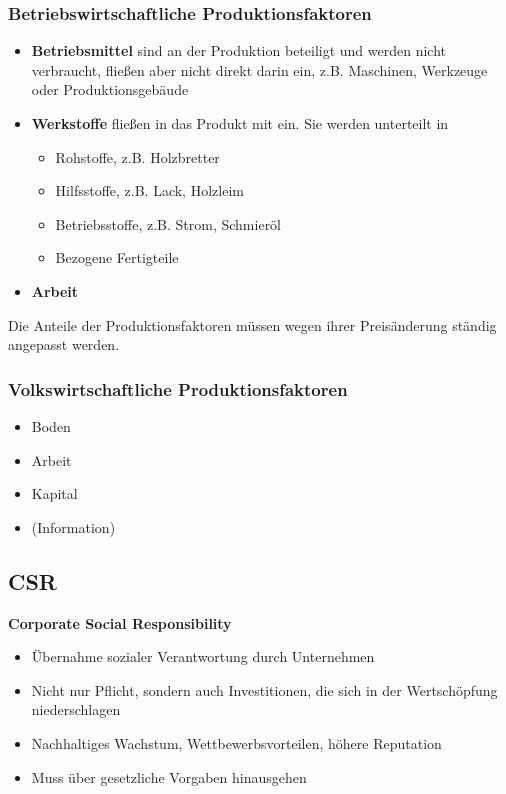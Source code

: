 \documentclass[titlepage,parskip=half]{scrartcl}
\begin{document}
\subsubsection{Betriebswirtschaftliche Produktionsfaktoren}
\begin{itemize}
    \item \textbf{Betriebsmittel} sind an der Produktion beteiligt und werden nicht verbraucht, fließen aber nicht direkt darin ein, z.B. Maschinen, Werkzeuge oder Produktionsgebäude
    \item \textbf{Werkstoffe} fließen in das Produkt mit ein. Sie werden unterteilt in
    \begin{itemize}
        \item Rohstoffe, z.B. Holzbretter
        \item Hilfsstoffe, z.B. Lack, Holzleim
        \item Betriebsstoffe, z.B. Strom, Schmieröl
        \item Bezogene Fertigteile
    \end{itemize}
    \item \textbf{Arbeit}
\end{itemize}
Die Anteile der Produktionsfaktoren müssen wegen ihrer Preisänderung ständig angepasst werden.
\subsubsection{Volkswirtschaftliche Produktionsfaktoren}
\begin{itemize}
    \item Boden
    \item Arbeit
    \item Kapital
    \item (Information)
\end{itemize}

\subsection{CSR}
\textbf{Corporate Social Responsibility}
\begin{itemize}
    \item Übernahme sozialer Verantwortung durch Unternehmen
    \item Nicht nur Pflicht, sondern auch Investitionen, die sich in der Wertschöpfung niederschlagen
    \item Nachhaltiges Wachstum, Wettbewerbsvorteilen, höhere Reputation
    \item Muss über gesetzliche Vorgaben hinausgehen
\end{itemize}
\end{document}
